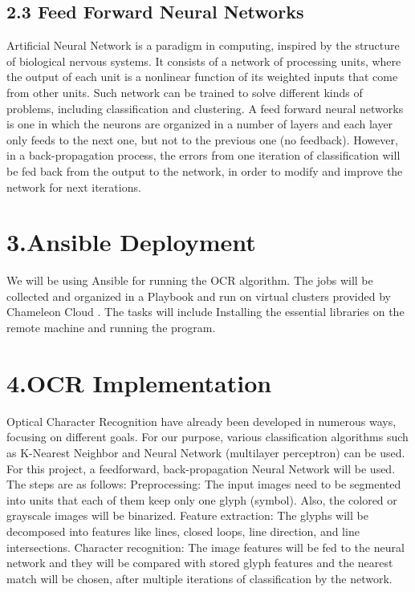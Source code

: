 \documentclass[9pt,twocolumn,twoside]{../../styles/osajnl}
\begin{document}
\subsection{2.3 Feed Forward Neural Networks}
Artificial Neural Network is a paradigm in computing, inspired by the
structure of biological nervous systems. It consists of a network of
processing units, where the output of each unit is a nonlinear
function of its weighted inputs that come from other units. Such
network can be trained to solve different kinds of problems, including
classification and clustering. A feed forward neural networks is one
in which the neurons are organized in a number of layers and each
layer only feeds to the next one, but not to the previous one (no
feedback). However, in a back-propagation process, the errors from one
iteration of classification will be fed back from the output to the
network, in order to modify and improve the network for next
iterations.

\section{3.Ansible Deployment}
We will be using Ansible \cite{www-ansible} for running the OCR algorithm. The jobs
will be collected and organized in a Playbook \cite{www-ansible-playbook} and run on virtual
clusters provided by Chameleon Cloud \cite{www-chameleoncloud}.  The tasks will include
Installing the essential libraries on the remote machine and running
the program.

\section{4.OCR Implementation}

Optical Character Recognition have already been developed in numerous
ways, focusing on different goals. For our purpose, various
classification algorithms such as K-Nearest Neighbor and Neural
Network (multilayer perceptron) can be used. For this project, a
feedforward, back-propagation Neural Network will be used. The steps
are as follows: Preprocessing: The input images need to be segmented
into units that each of them keep only one glyph (symbol). Also, the
colored or grayscale images will be binarized.  Feature extraction:
The glyphs will be decomposed into features like lines, closed loops,
line direction, and line intersections.  Character recognition: The
image features will be fed to the neural network and they will be
compared with stored glyph features and the nearest match will be
chosen, after multiple iterations of classification by the network.
\end{document}
